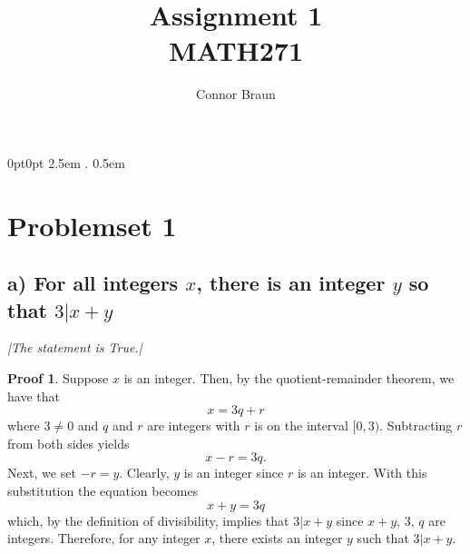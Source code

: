\documentclass[11pt, letterpaper]{article}
\begin{document}
\title{Assignment 1\\\normalsize MATH271}
\author{Connor Braun}

\theoremstyle{definition}
\newtheorem*{prf}{Proof}
\newtheorem*{sol}{Solution}
\newtheorem{case}{Case}
    {0pt}{0pt}
    {\hangindent 2.5em}
    {}
    {\bfseries}
    {.}
    {0.5em}
    {}
\theoremstyle{mythrm}
\newtheorem{lemma}{Lemma}

\maketitle
\section*{Problemset 1}

\subsection*{a) For all integers $x$, there is an integer $y$ so that $3|x+y$}
{\large\it |The statement is True.|}
\begin{prf}
    Suppose $x$ is an integer. Then, by the quotient-remainder theorem, we have that
    \[x=3q+r\]
    where $3\neq 0$ and $q$ and $r$ are integers with $r$ is on the interval $[0,3)$. Subtracting $r$ from 
    both sides yields
    \[x-r=3q\text{.}\]
    Next, we set $-r=y$. Clearly, $y$ is an integer since $r$ is an integer. With this 
    substitution the equation becomes
    \[x+y=3q\]
    which, by the definition of divisibility, implies that $3|x+y$ since $x+y,\,3,\, 
    q$ are integers. Therefore, for any integer $x$, there exists an integer $y$ such
    that $3|x+y$.
\end{prf}
\end{document}
